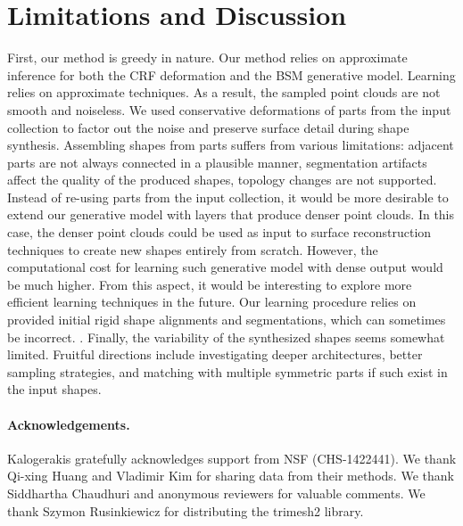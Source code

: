 \section{Limitations and Discussion}
\label{sec:limitations_discussion}

 First, our method is greedy in nature. Our method relies on approximate inference for both the CRF deformation and the BSM generative model. Learning relies on approximate techniques. As a result, the sampled point clouds are not smooth and noiseless. We used conservative deformations of parts from the input collection to factor out the noise and preserve surface detail during shape synthesis. Assembling shapes from parts suffers from various limitations: adjacent parts are not always connected in a plausible manner, segmentation artifacts affect the quality of the produced shapes, topology changes are not supported. Instead of re-using parts from the input collection, it would be more desirable to extend our generative model with layers that produce denser point clouds. In this case, the denser point clouds could be used as input to surface reconstruction techniques to create new shapes entirely from scratch. However, the computational cost for learning such generative model with dense output would be much higher. From this aspect, it would be interesting to explore more efficient learning techniques in the future. Our  learning procedure relies on provided initial rigid shape alignments and segmentations, which can sometimes be incorrect.  . Finally, the variability of the synthesized shapes seems somewhat limited. Fruitful directions include investigating deeper architectures, better sampling strategies, and matching  with multiple symmetric parts if such exist in the input shapes. 

\vspace{-2mm}

\paragraph*{Acknowledgements.} 
Kalogerakis gratefully acknowledges support from NSF (CHS-1422441).
We thank Qi-xing Huang and Vladimir Kim for sharing data from their methods.
We thank Siddhartha Chaudhuri and anonymous reviewers for valuable comments. 
We thank Szymon Rusinkiewicz for distributing the trimesh2 library. 

\vspace{-1mm}
